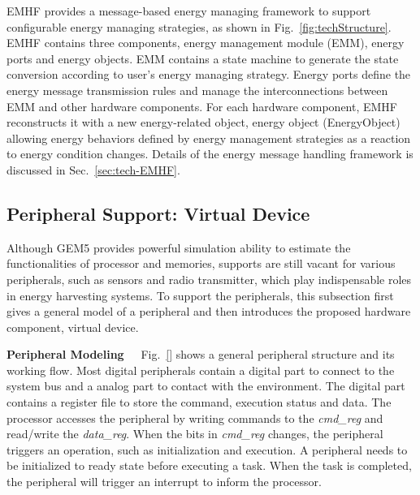 %
EMHF provides a message-based energy managing framework to support configurable energy managing strategies, as shown in Fig.~\ref{fig:techStructure}.
EMHF contains three components, energy management module (EMM), energy ports and energy objects. 
EMM contains a state machine to generate the state conversion according to user's energy managing strategy. 
Energy ports define the energy message transmission rules and manage the interconnections between EMM and other hardware components.
For each hardware component, EMHF reconstructs it with a new energy-related object, energy object (EnergyObject) allowing energy behaviors defined by energy management strategies as a reaction to energy condition changes.
Details of the energy message handling framework is discussed in Sec.~\ref{sec:tech-EMHF}.


\subsection{Peripheral Support: Virtual Device}	\label{sec:tech-vdev}
%
Although GEM5 provides powerful simulation ability to estimate the functionalities of processor and memories, supports are still vacant for various peripherals, such as sensors and radio transmitter, which play indispensable roles in energy harvesting systems.
To support the peripherals, this subsection first gives a general model of a peripheral and then introduces the proposed hardware component, virtual device.

\textbf{Peripheral Modeling\ \ }
%
Fig.~\ref{} shows a general peripheral structure and its working flow.
Most digital peripherals contain a digital part to connect to the system bus and a analog part to contact with the environment.
The digital part contains a register file to store the command, execution status and data.
The processor accesses the peripheral by writing commands to the \emph{cmd\_reg} and read/write the \emph{data\_reg}.
When the bits in \emph{cmd\_reg} changes, the peripheral triggers an operation, such as initialization and execution.
A peripheral needs to be initialized to ready state before executing a task.
When the task is completed, the peripheral will trigger an interrupt to inform the processor.

